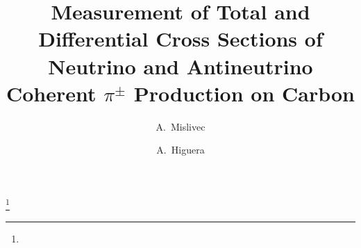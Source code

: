 \documentclass[aps,prd,preprint,showpacs,superscriptaddress,nofootinbib,linenumbers,floatfix]{revtex4-1}
\begin{document}


\title{Measurement of Total and Differential Cross Sections of Neutrino and Antineutrino Coherent $\pi^\pm$ Production on Carbon}




\author{A.~Mislivec}                       \affiliation{\Rochester}
\author{A.~Higuera}\thanks{\higueraThanks} \affiliation{\Rochester}  \affiliation{\Guanajuato}



\end{document}
